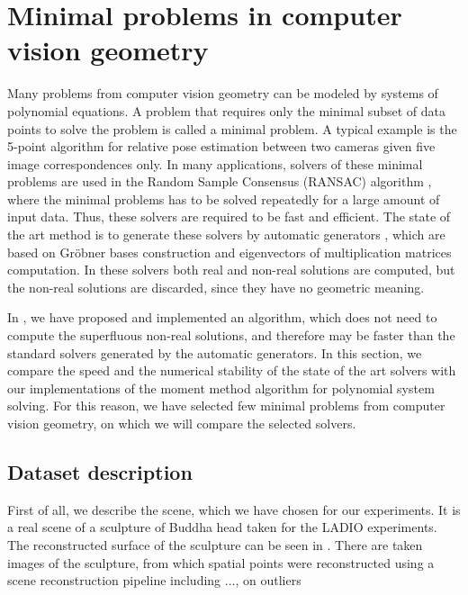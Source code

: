 \chapter{Minimal problems in computer vision geometry}
Many problems from computer vision geometry can be modeled by systems of polynomial equations.
A problem that requires only the minimal subset of data points to solve the problem is called a minimal problem.
A typical example is the 5-point algorithm \cite{5pt} for relative pose estimation between two cameras given five image correspondences only.
In many applications, solvers of these minimal problems are used in the Random Sample Consensus (RANSAC) algorithm \cite{ransac}, where the minimal problems has to be solved repeatedly for a large amount of input data.
Thus, these solvers are required to be fast and efficient.
The state of the art method is to generate these solvers by automatic generators \cite{autogen}, which are based on Gr\"obner bases construction and eigenvectors of multiplication matrices computation.
In these solvers both real and non-real solutions are computed, but the non-real solutions are discarded, since they have no geometric meaning.

In , we have proposed and implemented an algorithm, which does not need to compute the superfluous non-real solutions, and therefore may be faster than the standard solvers generated by the automatic generators.
In this section, we compare the speed and the numerical stability of the state of the art solvers with our implementations of the moment method algorithm for polynomial system solving.
For this reason, we have selected few minimal problems from computer vision geometry, on which we will compare the selected solvers.

\section{Dataset description}

First of all, we describe the scene, which we have chosen for our experiments.
It is a real scene of a sculpture of Buddha head taken for the LADIO \cite{ladio} experiments.
The reconstructed surface of the sculpture can be seen in .
There are \importAppLADIONumCameras{} taken images of the sculpture, from which \importAppLADIONumPoints{} spatial points were reconstructed using a scene reconstruction pipeline including ..., on outliers

